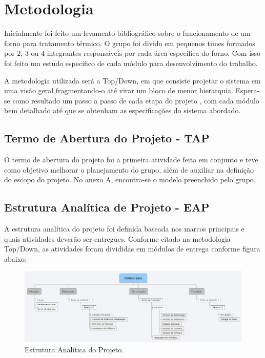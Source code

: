 \chapter[Metodologia]{Metodologia}

Inicialmente foi feito um levamento bibliográfico sobre o funcionamento de um forno para tratamento térmico. O grupo foi divido em pequenos times formados por 2, 3 ou 4 integrantes responsáveis por cada área específica do forno. Com isso foi feito um estudo específico de cada módulo para desenvolvimento do trabalho.

A metodologia utilizada será a Top/Down, em que consiste projetar o sistema em uma visão geral fragmentando-o até virar um bloco de menor hierarquia. Espera-se como resultado um passo a passo de cada etapa do projeto , com cada módulo bem detalhado até que se obtenham as especificações do sistema abordado.


\section{Termo de Abertura do Projeto - TAP}

O termo de abertura do projeto foi a primeira atividade feita em conjunto e teve como objetivo melhorar o planejamento do grupo, além de auxiliar na definição do escopo do projeto. No anexo A, encontra-se o modelo preenchido pelo grupo.

\section{Estrutura Analítica de Projeto - EAP}

A estrutura analítica do projeto foi definida baseada nos marcos principais e quais atividades deverão ser entregues.  Conforme citado na metodologia Top/Down, as atividades foram divididas em módulos de entrega conforme figura abaixo:

\begin{figure}[!h]
	\centering
	\label{eap}
	\includegraphics[keepaspectratio=true,scale=0.3]{figuras/eap.jpg}
	\caption{Estrutura Analítica do Projeto.}
\end{figure}

